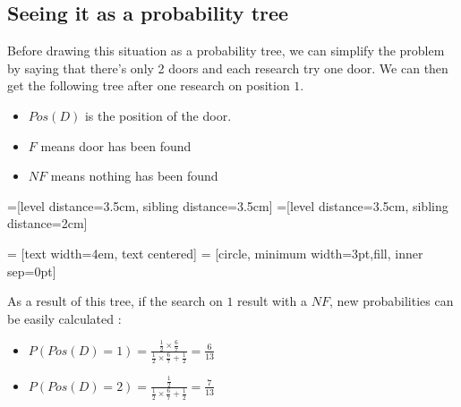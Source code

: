 \documentclass{article}
\begin{document}
\subsection{Seeing it as a probability tree}
Before drawing this situation as a probability tree, we can simplify the
problem by saying that there's only 2 doors and each research try one door.
We can then get the following tree after one research on position $1$.
\begin{itemize}
\item $Pos(D)$ is the position of the door.
\item $F$ means door has been found
\item $NF$ means nothing has been found
\end{itemize}
=[level distance=3.5cm, sibling distance=3.5cm]
=[level distance=3.5cm, sibling distance=2cm]

 = [text width=4em, text centered]
 = [circle, minimum width=3pt,fill, inner sep=0pt]
\begin{center}
\end{center}

As a result of this tree, if the search on $1$ result with a $NF$, new
probabilities can be easily calculated :
\begin{itemize}
\item $P(Pos(D) = 1) = \frac{\frac{1}{2} \times \frac{6}{7}}
                            {\frac{1}{2} \times \frac{6}{7} +
                             \frac{1}{2}}
                     = \frac{6}{13}$
\item $P(Pos(D) = 2) = \frac{\frac{1}{2}}
                            {\frac{1}{2} \times \frac{6}{7} +
                             \frac{1}{2}}
                     = \frac{7}{13}$
\end{itemize}
\end{document}
